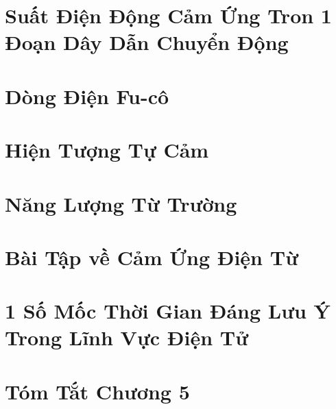 \documentclass[oneside]{book}
\numberwithin{equation}{section}
\begin{document}

\section{Suất Điện Động Cảm Ứng Tron 1 Đoạn Dây Dẫn Chuyển Động}


\section{Dòng Điện Fu-cô}


\section{Hiện Tượng Tự Cảm}


\section{Năng Lượng Từ Trường}


\section{Bài Tập về Cảm Ứng Điện Từ}


\section{1 Số Mốc Thời Gian Đáng Lưu Ý Trong Lĩnh Vực Điện Tử}


\section{Tóm Tắt Chương 5}

\end{document}
